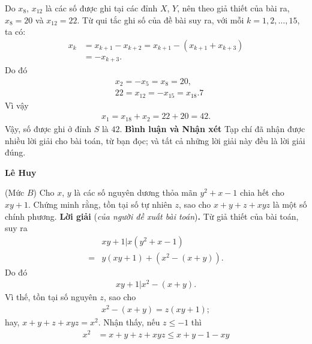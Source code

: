 \begin{multicols}{2}
	Do $x_8$, $x_{12}$ là các số được ghi tại các đỉnh $X$, $Y$, nên theo giả thiết của bài ra, $x_8 =20$  và  $x_{12} = 22$.
	\vskip 0.05cm
	Từ qui tắc ghi số của đề bài suy ra, với mỗi $k = 1, 2, \ldots, 15$, ta có:
	\begin{align*}
		{x_k} &= {x_{k + 1}} - {x_{k + 2}} = {x_{k + 1}} - \left( {{x_{k + 1}} + {x_{k + 3}}} \right) \\
		&=  - {x_{k + 3}}.
	\end{align*}
	Do đó
		\begin{align*}
			&{x_2} =  - {x_5} = {x_8} = 20,\\
			&22 = {x_{12}} =  - {x_{15}} = {x_{18}}.7
		\end{align*}
	Vì vậy
	\begin{align*}
		{x_1} = {x_{18}} + {x_2} = 22 + 20 = 42.
	\end{align*}
	Vậy, số được ghi ở đỉnh $S$ là $42$.
	\vskip 0.05cm
	\textbf{\color{thachthuctoanhoc}Bình luận và Nhận xét}
	\vskip 0.05cm	
	Tạp chí đã nhận được nhiều lời giải cho bài toán, từ bạn đọc; và tất cả những lời giải này đều là lời giải đúng.
	\begin{flushright}
		\textbf{\color{thachthuctoanhoc}Lê Huy}
	\end{flushright}
	{}
	(Mức $B$)
	Cho $x$, $y$ là các số nguyên dương thỏa mãn $y^2 + x - 1$ chia hết cho $xy + 1$. Chứng minh rằng, tồn tại số tự nhiên $z$, sao cho $x + y + z + xyz$ là một số chính phương.
	\vskip 0.05cm
	\textbf{\color{thachthuctoanhoc}Lời giải} (\textit{của người đề xuất bài toán})\textbf{\color{thachthuctoanhoc}.}
	\vskip 0.05cm
	Từ giả thiết của bài toán, suy ra
	\begin{align*}
		&\left. {xy + 1} \right|x\left( {{y^2} + x - 1} \right) \\
		= &y\left( {xy + 1} \right) + \left( {{x^2} - \left( {x + y} \right)} \right).
	\end{align*}
	Do đó
	\begin{align*}
		\left. {xy + 1} \right|{x^2} - \left( {x + y} \right).
	\end{align*}
	Vì thế, tồn tại số nguyên $z$, sao cho
	\begin{align*}
		{x^2} - \left( {x + y} \right) = z\left( {xy + 1} \right);
	\end{align*}
	hay, $x + y + z + xyz = {x^2}.$
	\vskip 0.05cm  
	Nhận thấy, nếu $z \le -1$  thì
	\begin{align*}
		{x^2} &= x + y + z + xyz \le x + y - 1 - xy \\

\end{align*}
\end{multicols}
